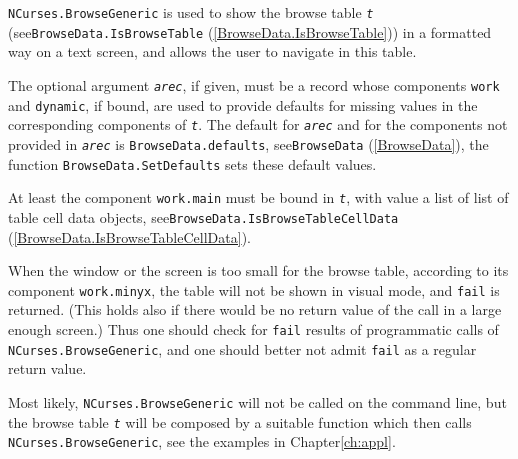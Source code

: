 \documentclass[a4paper,11pt]{report}
\begin{document}
{{{ \texttt{NCurses.BrowseGeneric} is used to show the browse table \mbox{\texttt{\mdseries\slshape t}} (see{\nobreakspace}\texttt{BrowseData.IsBrowseTable} (\ref{BrowseData.IsBrowseTable})) in a formatted way on a text screen, and allows the user to navigate in this
table. 

 The optional argument \mbox{\texttt{\mdseries\slshape arec}}, if given, must be a record whose components \texttt{work} and \texttt{dynamic}, if bound, are used to provide defaults for missing values in the
corresponding components of \mbox{\texttt{\mdseries\slshape t}}. The default for \mbox{\texttt{\mdseries\slshape arec}} and for the components not provided in \mbox{\texttt{\mdseries\slshape arec}} is \texttt{BrowseData.defaults}, see{\nobreakspace}\texttt{BrowseData} (\ref{BrowseData}), the function \texttt{BrowseData.SetDefaults} sets these default values. 

 At least the component \texttt{work.main} must be bound in \mbox{\texttt{\mdseries\slshape t}}, with value a list of list of table cell data objects, see{\nobreakspace}\texttt{BrowseData.IsBrowseTableCellData} (\ref{BrowseData.IsBrowseTableCellData}). 

 When the window or the screen is too small for the browse table, according to
its component \texttt{work.minyx}, the table will not be shown in visual mode, and \texttt{fail} is returned. (This holds also if there would be no return value of the call in
a large enough screen.) Thus one should check for \texttt{fail} results of programmatic calls of \texttt{NCurses.BrowseGeneric}, and one should better not admit \texttt{fail} as a regular return value. 

 Most likely, \texttt{NCurses.BrowseGeneric} will not be called on the command line, but the browse table \mbox{\texttt{\mdseries\slshape t}} will be composed by a suitable function which then calls \texttt{NCurses.BrowseGeneric}, see the examples in Chapter{\nobreakspace}\ref{ch:appl}. }

 }

 }

  
\end{document}
